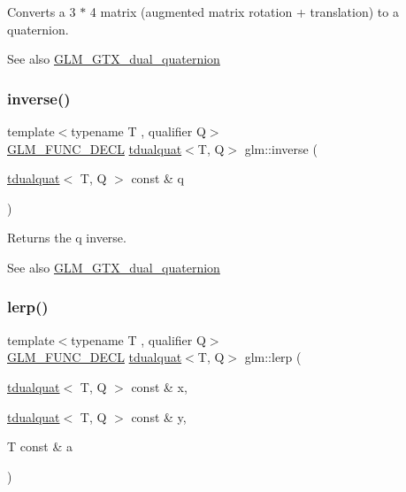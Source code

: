 Converts a 3 $\ast$ 4 matrix (augmented matrix rotation + translation) to a quaternion.

\begin{DoxySeeAlso}{See also}
\mbox{\hyperlink{group__gtx__dual__quaternion}{G\+L\+M\+\_\+\+G\+T\+X\+\_\+dual\+\_\+quaternion}} 
\end{DoxySeeAlso}
\mbox{\label{group__gtx__dual__quaternion_ga070f521a953f6461af4ab4cf8ccbf27e}} 
\subsubsection{\texorpdfstring{inverse()}{inverse()}}
{\footnotesize\ttfamily template$<$typename T , qualifier Q$>$ \\
\mbox{\hyperlink{setup_8hpp_ab2d052de21a70539923e9bcbf6e83a51}{G\+L\+M\+\_\+\+F\+U\+N\+C\+\_\+\+D\+E\+CL}} \mbox{\hyperlink{structglm_1_1tdualquat}{tdualquat}}$<$T, Q$>$ glm\+::inverse (\begin{DoxyParamCaption}\item[{\mbox{\hyperlink{structglm_1_1tdualquat}{tdualquat}}$<$ T, Q $>$ const \&}]{q }\end{DoxyParamCaption})}

Returns the q inverse.

\begin{DoxySeeAlso}{See also}
\mbox{\hyperlink{group__gtx__dual__quaternion}{G\+L\+M\+\_\+\+G\+T\+X\+\_\+dual\+\_\+quaternion}} 
\end{DoxySeeAlso}
\mbox{\label{group__gtx__dual__quaternion_gace8380112d16d33f520839cb35a4d173}} 
\subsubsection{\texorpdfstring{lerp()}{lerp()}}
{\footnotesize\ttfamily template$<$typename T , qualifier Q$>$ \\
\mbox{\hyperlink{setup_8hpp_ab2d052de21a70539923e9bcbf6e83a51}{G\+L\+M\+\_\+\+F\+U\+N\+C\+\_\+\+D\+E\+CL}} \mbox{\hyperlink{structglm_1_1tdualquat}{tdualquat}}$<$T, Q$>$ glm\+::lerp (\begin{DoxyParamCaption}\item[{\mbox{\hyperlink{structglm_1_1tdualquat}{tdualquat}}$<$ T, Q $>$ const \&}]{x,  }\item[{\mbox{\hyperlink{structglm_1_1tdualquat}{tdualquat}}$<$ T, Q $>$ const \&}]{y,  }\item[{T const \&}]{a }\end{DoxyParamCaption})}

